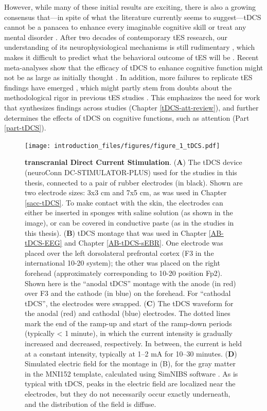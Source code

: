 \documentclass[11pt,english,]{memoir}
\begin{document}
However, while many of these initial results are exciting, there is also a growing consensus that---in spite of what the literature currently seems to suggest---tDCS cannot be a panacea to enhance every imaginable cognitive skill or treat any mental disorder \autocites{Bestmann2017}{Parkin2015}. After two decades of contemporary tES research, our understanding of its neurophysiological mechanisms is still rudimentary \autocites{Fertonani2017}{Liu2018}, which makes it difficult to predict what the behavioral outcome of tES will be \autocites{Bestmann2014}{DeBerker2013}. Recent meta-analyses show that the efficacy of tDCS to enhance cognitive function might not be as large as initially thought \autocites{Horvath2015}{Medina2017}. In addition, more failures to replicate tES findings have emerged \autocites[e.g.,][]{Boayue2019}{Horvath2015b}{Learmonth2017}{Veniero2017}, which might partly stem from doubts about the methodological rigor in previous tES studies \autocites{Heroux2017}{Horvath2015a}{Minarik2016}. This emphasizes the need for work that synthesizes findings across studies (Chapter \ref{tDCS-att-review}), and further determines the effects of tDCS on cognitive functions, such as attention (Part \ref{part-tDCS}).

\begin{figure}
\centering
\texttt{[image: introduction\_files/figures/figure\_1\_tDCS.pdf]}
\caption{\label{fig:figure-1-tDCS}\textbf{transcranial Direct Current Stimulation}. (\textbf{A}) The tDCS device (neuroConn DC-STIMULATOR-PLUS) used for the studies in this thesis, connected to a pair of rubber electrodes (in black). Shown are two electrode sizes: 3x3 cm and 7x5 cm, as was used in Chapter \ref{sacc-tDCS}. To make contact with the skin, the electrodes can either be inserted in sponges with saline solution (as shown in the image), or can be covered in conductive paste (as in the studies in this thesis). (\textbf{B}) tDCS montage that was used in Chapter \ref{AB-tDCS-EEG} and Chapter \ref{AB-tDCS-sEBR}. One electrode was placed over the left dorsolateral prefrontal cortex (F3 in the international 10-20 system); the other was placed on the right forehead (approximately corresponding to 10-20 position Fp2). Shown here is the ``anodal tDCS'' montage with the anode (in red) over F3 and the cathode (in blue) on the forehead. For ``cathodal tDCS'', the electrodes were swapped. (\textbf{C}) The tDCS waveform for the anodal (red) and cathodal (blue) electrodes. The dotted lines mark the end of the ramp-up and start of the ramp-down periods (typically \textless{} 1 minute), in which the current intensity is gradually increased and decreased, respectively. In between, the current is held at a constant intensity, typically at 1--2 mA for 10--30 minutes. (\textbf{D}) Simulated electric field for the montage in (B), for the gray matter in the MNI152 template, calculated using SimNIBS software \autocites[Version 2.2.1;][]{Saturnino2018}{Thielscher2015}. As is typical with tDCS, peaks in the electric field are localized near the electrodes, but they do not necessarily occur exactly underneath, and the distribution of the field is diffuse.}
\end{figure}
\end{document}
